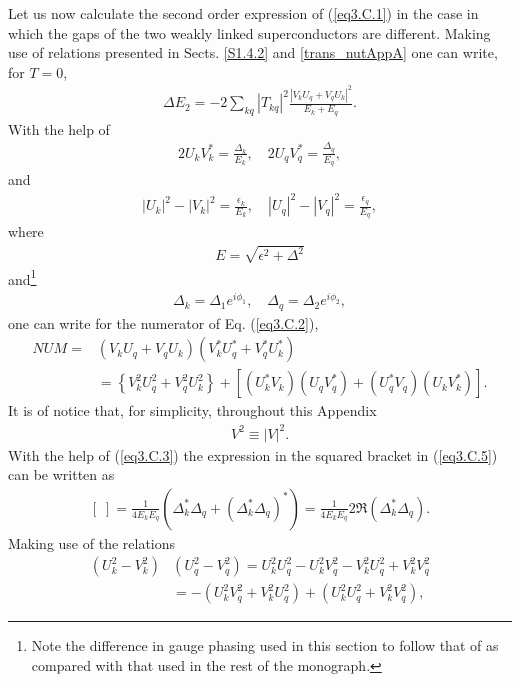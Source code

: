 Let us now calculate the second order expression of  (\ref{eq3.C.1}) in the case in which the gaps of the two weakly linked superconductors are different.
Making use of  relations presented in Sects. \ref{S1.4.2} and \ref{trans_nutAppA} one can write, for $T=0$,
\begin{align}\label{eq3.C.2}
\Delta E_2=-2\sum_{kq}|T_{kq}|^2\frac{|V_kU_q+V_qU_k|^2}{E_k+E_q}.
\end{align}
With the help of 
\begin{align}\label{eq3.C.3}
2U_kV_k^*=\frac{\Delta_k}{E_k},\quad 2U_qV_q^*=\frac{\Delta_q}{E_q},
\end{align}
and
\begin{align}
|U_k|^2-|V_k|^2=\frac{\epsilon_k}{E_k},\quad |U_q|^2-|V_q|^2=\frac{\epsilon_q}{E_q},
\end{align}
where
\begin{align}
E=\sqrt{\epsilon^2+\Delta^2}
\end{align}
and\footnote{Note the difference in gauge phasing used in this section to follow that of \cite{Anderson:64b} as compared with that used in the rest of the monograph.}
\begin{align}\label{eq3.C.6}
\Delta_k=\Delta_1e^{i\phi_1},\quad \Delta_q=\Delta_2e^{i\phi_2},
\end{align}
one can write for the numerator of Eq. (\ref{eq3.C.2}),
\begin{align}\label{eq3.C.5}
\nonumber NUM=&\left(V_kU_q+V_qU_k\right)\left(V^*_kU^*_q+V^*_qU^*_k\right)\\
&=\left\{V^2_kU^2_q+V^2_qU^2_k\right\}+\left[(U_k^*V_k)(U_qV^*_q)+(U_q^*V_q)(U_kV^*_k)\right].
\end{align}
It is of notice that, for simplicity, throughout this Appendix
\begin{align}
V^2\equiv|V|^2.
\end{align}
With the help of (\ref{eq3.C.3}) the expression in the squared bracket in (\ref{eq3.C.5}) can be written as 
\begin{align}\label{eq3.C.9}
[\;]=\frac{1}{4E_kE_q}\left(\Delta_k^*\Delta_q+(\Delta_k^*\Delta_q)^*\right)=\frac{1}{4E_kE_q}2\Re(\Delta_k^*\Delta_q).
\end{align}
Making use of the relations
\begin{align}
\nonumber \left(U_k^2-V_k^2\right)&\left(U_q^2-V_q^2\right)=U_k^2U_q^2-U_k^2V_q^2-V_k^2U_q^2+V_k^2V_q^2\\
&=-\left(U_k^2V_q^2+V_k^2U_q^2\right)+\left(U_k^2U_q^2+V_k^2V_q^2\right),
\end{align}
